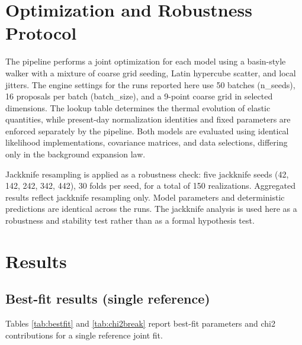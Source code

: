 \documentclass[11pt]{article}
\begin{document}
\section{Optimization and Robustness Protocol}
The pipeline performs a joint optimization for each model using a basin-style walker with a mixture of coarse grid seeding, Latin hypercube scatter, and local jitters.
The engine settings for the runs reported here use 50 batches (n\_seeds), 16 proposals per batch (batch\_size), and a 9-point coarse grid in selected dimensions.
The lookup table determines the thermal evolution of elastic quantities, while present-day normalization identities and fixed parameters are enforced separately by the pipeline.
Both models are evaluated using identical likelihood implementations, covariance matrices, and data selections, differing only in the background expansion law.

Jackknife resampling is applied as a robustness check:
five jackknife seeds (42, 142, 242, 342, 442), 30 folds per seed, for a total of 150 realizations.
Aggregated results reflect jackknife resampling only. Model parameters and deterministic predictions are identical across the runs.
The jackknife analysis is used here as a robustness and stability test rather than as a formal hypothesis test.

\clearpage
\section{Results}
\subsection{Best-fit results (single reference)}
Tables \ref{tab:bestfit} and \ref{tab:chi2break} report best-fit parameters and chi2 contributions for a single reference joint fit.\protect\footnotemark[2]

\begin{table}[ht]
\centering

\caption{Best-fit parameters for the reference joint fit.
For PBUF, \(\Omega_{m0}\) and \(\Omega_{b0}\) are not free parameters but are derived from the elastic amplitude \(\alpha_{\mathrm{resolved}}\) via enforced identities.
The quantity reported as \(\Omega_{k0}\) corresponds to \(\alpha_{\mathrm{resolved}}\) and does not represent an independent curvature parameter.
Rmax is a fixed structural scale defining future elastic activation and is not fitted or constrained by the data.}
\label{tab:bestfit}
\end{table}
\end{document}
